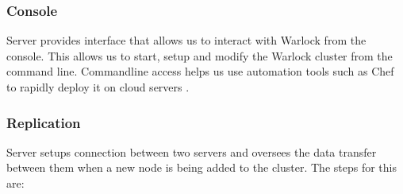 
\subsubsection{Console}

Server provides interface that allows us to interact with Warlock from the 
console. This allows us to start, setup and modify the Warlock cluster from
the command line. Commandline access helps us use automation tools such as
Chef \citep{Chef} to rapidly deploy it on cloud servers 
\citep{Armbrust:2010:VCC:1721654.1721672, amazonAWS}.

\subsubsection{Replication}

Server setups connection between two servers and oversees the data transfer 
between them when a new node is being added to the cluster. The steps for
this are:

